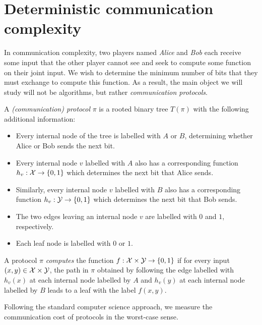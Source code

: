 \chapter[CH01]{Deterministic communication complexity}

In communication complexity, two players named \emph{Alice} and \emph{Bob} each receive some input that the other player cannot see and seek to compute some function on their joint input. We wish to determine the minimum number of bits that they must exchange to compute this function. As a result, the main object we will study will not be algorithms, but rather \emph{communication protocols}. 

\newpage

\begin{definition}[Protocol]
	A \emph{(communication) protocol} $\pi$ is a rooted binary tree $T(\pi)$ with the following additional information:
	\begin{itemize}
		\item Every internal node of the tree is labelled with $A$ or $B$, determining whether Alice or Bob sends the next bit.
		\item Every internal node $v$ labelled with $A$ also has a corresponding function $h_v : \mathcal{X} \to \{0,1\}$ which determines the next bit that Alice sends.
		\item Similarly, every internal node $v$ labelled with $B$ also has a corresponding function $h_v : \mathcal{Y} \to \{0,1\}$ which determines the next bit that Bob sends.
		\item The two edges leaving an internal node $v$ are labelled with $0$ and $1$, respectively.
		\item Each leaf node is labelled with $0$ or $1$.
	\end{itemize}
\end{definition}

\begin{definition}
	A protocol $\pi$ \emph{computes} the function $f : \mathcal{X} \times \mathcal{Y} \to \{0,1\}$ if for every input $(x,y) \in \mathcal{X} \times \mathcal{Y}$, the path in $\pi$ obtained by following the edge labelled with $h_v(x)$ at each internal node labelled by $A$ and $h_v(y)$ at each internal node labelled by $B$ leads to a leaf with the label $f(x,y)$.
\end{definition}

Following the standard computer science approach, we measure the communication cost of protocols in the worst-case sense.

